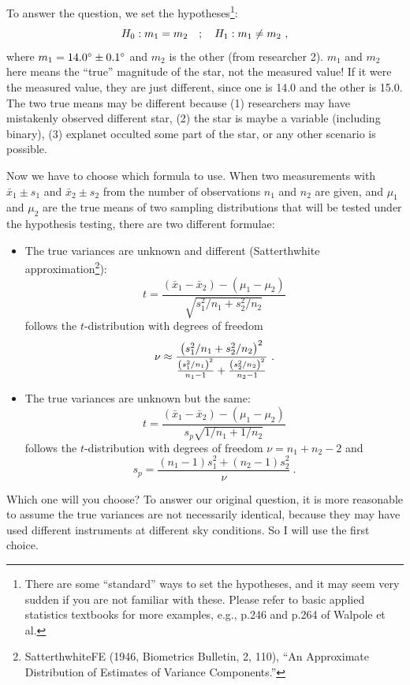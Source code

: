 To answer the question, we set the hypotheses\footnote{There are some ``standard'' ways to set the hypotheses, and it may seem very sudden if you are not familiar with these. Please refer to basic applied statistics textbooks for more examples, e.g., p.246 and p.264 of Walpole et al.}:
\begin{equation}
  H_0 : m_1 = m_2 
  \quad;\quad
  H_1 : m_1 \neq m_2 ~,
\end{equation}
where $ m_1 = \m{14.0} \pm \m{0.1} $ and $ m_2 $ is the other (from researcher 2). $ m_1 $ and $ m_2 $ here means the ``true'' magnitude of the star, not the measured value! If it were the measured value, they are just different, since one is 14.0 and the other is 15.0. The two true means may be different because (1) researchers may have mistakenly observed different star, (2) the star is maybe a variable (including binary), (3) explanet occulted some part of the star, or any other scenario is possible.

Now we have to choose which formula to use. When two measurements with $ \bar{x}_1 \pm s_1 $ and $ \bar{x}_2 \pm s_2 $ from the number of observations $ n_1 $ and $ n_2 $ are given, and $ \mu_1 $ and $ \mu_2 $ are the true means of two sampling distributions that will be tested under the hypothesis testing, there are two different formulae:
\begin{itemize}
\item The true variances are unknown and different (Satterthwhite approximation\footnote{SatterthwhiteFE (1946, Biometrics Bulletin, 2, 110), ``An Approximate Distribution of Estimates of Variance Components.''}):
\begin{equation}
  t = \frac{(\bar{x}_1 - \bar{x}_2) - (\mu_1 - \mu_2) }{\sqrt{s_1^2 / n_1 + s_2^2 / n_2}}
\end{equation}
follows the $ t $-distribution with degrees of freedom
\begin{equation}
  \nu \approx 
    \frac{\qty( s_1^2 / n_1 + s_2^2 / n_2 )^2}
    {\frac{ \qty(s_1^2 / n_1)^2 }{n_1 - 1}
      + \frac{ \qty(s_2^2 / n_2)^2 }{n_2 - 1}} ~.
\end{equation}
\item The true variances are unknown but the same:
\begin{equation}
  t = \frac{(\bar{x}_1 - \bar{x}_2) - (\mu_1 - \mu_2) }{s_p \sqrt{1 / n_1 + 1 / n_2}}
\end{equation}
follows the $ t $-distribution with degrees of freedom $ \nu = n_1 + n_2 - 2 $ and
\begin{equation}
  s_p = \frac{(n_1 - 1) s_1^2 + (n_2 - 1) s_2^2}{\nu} ~.
\end{equation}
\end{itemize}
Which one will you choose? To answer our original question, it is more reasonable to assume the true variances are not necessarily identical, because they may have used different instruments at different sky conditions. So I will use the first choice.

